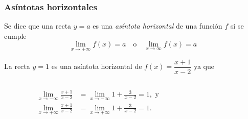 	
	\begin{frame}
		\frametitle{Asíntotas horizontales}
		\begin{definicion}
			Se dice que una recta $y=a$ es una \emph{asíntota horizontal} de una función $f$ si se cumple
			\[ \lim_{x\rightarrow +\infty}f(x)=a \quad \textrm{o} \quad \lim_{x\rightarrow \infty}f(x)=a \]
		\end{definicion}
		
		 La recta $y=1$ es una asíntota horizontal de $f(x)=\dfrac{x+1}{x-2}$ ya que
		\begin{columns}
			\begin{column}{0.5\textwidth}
				\begin{align*}
					\lim_{x\rightarrow -\infty}\frac{x+1}{x-2} & = \lim_{x\rightarrow -\infty}1+\frac{3}{x-2} = 1, \textrm{ y} \\
					\lim_{x\rightarrow +\infty}\frac{x+1}{x-2} & = \lim_{x\rightarrow +\infty}1+\frac{3}{x-2} = 1.             
				\end{align*}
			\end{column}
			\begin{column}{0.5\textwidth}
				\begin{center}
					\scalebox{1}{}
				\end{center}
			\end{column}
		\end{columns}
	\end{frame}
	
